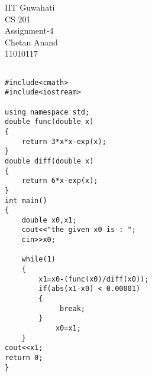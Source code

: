 \documentclass[13 pt]{article}
\begin{document}
\begin{Large}
\begin{center}
IIT Guwahati\\
CS 201\\
Assignment-4\\
Chetan Anand\\
11010117\\
\end{center}
\end{Large}
\lstset{language=C++,basicstyle=\footnotesize}
\begin{lstlisting}[caption=Test]

#include<cmath>
#include<iostream>

using namespace std;
double func(double x)
{
	return 3*x*x-exp(x);
}
double diff(double x)
{
	return 6*x-exp(x);
}
int main()
{
	double x0,x1;
	cout<<"the given x0 is : ";
	cin>>x0;

	while(1)
	{
		x1=x0-(func(x0)/diff(x0));
		if(abs(x1-x0) < 0.00001)
		{
			 break;
		}
			x0=x1;
	}
cout<<x1;
return 0;
}

\end{lstlisting}
\end{document}

